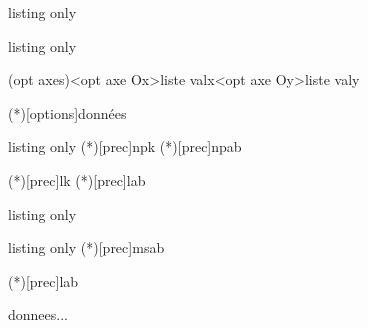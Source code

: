 \documentclass[a4paper,french,11pt]{article}
\begin{document}
\begin{PresCodeTexPL}{listing only}
\end{PresCodeTexPL}

\begin{PresCodeTexPL}{listing only}

\AxesTikz[options]
 
\FenetreTikz \OrigineTikz
\FenetreSimpleTikz[options](opt axes)<opt axe Ox>{liste valx}<opt axe Oy>{liste valy}
\PointMoyenTikz[options]

\BoiteMoustaches[options]
\BoiteMoustachesAxe[options]

\Histogramme(*)[options]{données}
\end{PresCodeTexPL}

\begin{PresCodeTexPL}{listing only}
\BinomP(*)[prec]{n}{p}{k}
\BinomC(*)[prec]{n}{p}{a}{b}

\PoissonP(*)[prec]{l}{k}
\PoissonC(*)[prec]{l}{a}{b}
\end{PresCodeTexPL}

\begin{PresCodeTexPL}{listing only}

\end{PresCodeTexPL}

\begin{PresCodeTexPL}{listing only}
\NormaleC(*)[prec]{m}{s}{a}{b}

\ExpoC(*)[prec]{l}{a}{b}

\begin{EnvArbreProbasTikz}[options]{donnees}...\end{EnvArbreProbasTikz}


\end{PresCodeTexPL}
\end{document}

